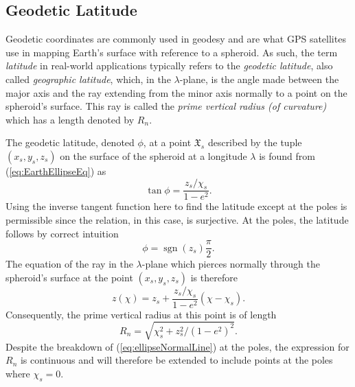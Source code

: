 \documentclass[11pt,dvipsnames]{thesis}
\newcommand{\raisesym}[2]{\raisebox{#2\depth}{$#1$}}
\begin{document}
\subsection{Geodetic Latitude}

Geodetic coordinates are commonly used in geodesy and are what GPS satellites use in mapping Earth's surface with reference to a spheroid. As such, the term \textit{latitude} in real-world applications typically refers to the \textit{geodetic latitude}, also called \textit{geographic latitude}, which, in the $\lambda$-plane, is the angle made between the major axis and the ray extending from the minor axis normally to a point on the spheroid's surface. This ray is called the \textit{prime vertical radius (of curvature)} which has a length denoted by $R_n$.

The geodetic latitude, denoted $\phi$, at a point $\mathfrak{X}_s$ described by the tuple $(x_s, y_s, z_s)$ on the surface of the spheroid at a longitude $\lambda$ is found from (\ref{eq:EarthEllipseEq}) as 
\begin{equation}
\tan\phi = \frac{z_s / \chi_s}{1 - e^2}. \label{eq:geodeticLatitudeDef}
\end{equation}
Using the inverse tangent function here to find the latitude except at the poles is permissible since the relation, in this case, is surjective. At the poles, the latitude follows by correct intuition 
\begin{equation}
\phi = \operatorname{sgn}(z_s) \frac{\pi}{2}.
\end{equation}
The equation of the ray in the $\lambda$-plane which pierces normally through the spheroid's surface at the point $(x_s, y_s, z_s)$ is therefore
\begin{equation}
z(\chi) = z_s + \frac{z_s / \chi_s}{1 - e^2}(\chi - \chi_s). \label{eq:ellipseNormalLine}
\end{equation}
Consequently, the prime vertical radius at this point is of length
\begin{equation}
R_n = \sqrt{\chi_s^2 + z_s^2 / (1-e^2)^2}.
\end{equation}
Despite the breakdown of (\ref{eq:ellipseNormalLine}) at the poles, the expression for $R_n$ is continuous and will therefore be extended to include points at the poles where $\chi_s = 0$.
\end{document}
